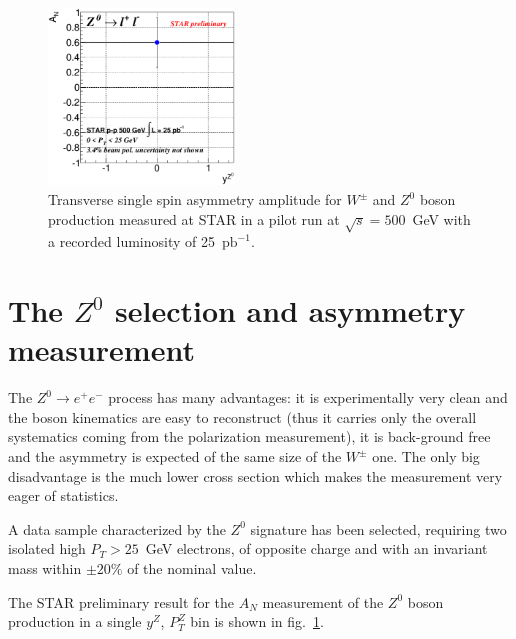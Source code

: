 \documentclass{PoS}
\begin{document}
\begin{figure}[htbp]
  \includegraphics[width=0.44\textwidth]{hd_Z0_AsymAmpSqrtVsRap}
  \caption{Transverse single spin asymmetry amplitude for $W^{\pm}$ and $Z^{0}$ boson production measured at STAR in a pilot run at $\sqrt{s}=500$~GeV with a recorded luminosity of 25~$\text{pb}^{-1}$.}
  \label{Fig:W-An}
\end{figure}


\section{The $Z^{0}$ selection and asymmetry measurement}
The $Z^{0}\rightarrow e^{+}e^{-}$ process has many advantages: it is experimentally very clean and the boson kinematics are easy to reconstruct (thus it carries only the overall systematics coming from the polarization measurement), it is back-ground free and the asymmetry is expected of the same size of the $W^{\pm}$ one. The only big disadvantage is the much lower cross section which makes the measurement very eager of statistics. 

A data sample characterized by the $Z^{0}$ signature has been selected, requiring two isolated high $P_{T} > 25$~GeV electrons, of opposite charge and with an invariant mass within $\pm 20 \%$ of the nominal value.

The STAR preliminary result for the $A_{N}$ measurement of the $Z^{0}$ boson production in a single $y^{Z}$, $P_{T}^{Z}$ bin is shown in fig.~\ref{Fig:W-An}. 
\end{document}
